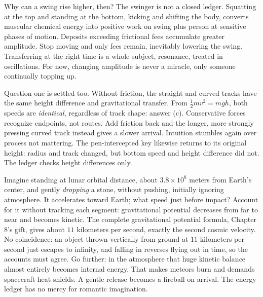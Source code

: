 Why can a swing rise higher, then? The swinger is not a closed ledger. Squatting at the top and standing at the bottom, kicking and shifting the body, converts muscular chemical energy into positive work on swing plus person at sensitive phases of motion. Deposits exceeding frictional fees accumulate greater amplitude. Stop moving and only fees remain, inevitably lowering the swing. Transferring at the right time is a whole subject, resonance, treated in oscillations. For now, changing amplitude is never a miracle, only someone continually topping up.

Question one is settled too. Without friction, the straight and curved tracks have the same height difference and gravitational transfer. From \(\frac{1}{2}mv^2=mgh\), both speeds are \emph{identical}, regardless of track shape: answer (c). Conservative forces recognize endpoints, not routes. Add friction back and the longer, more strongly pressing curved track instead gives a slower arrival. Intuition stumbles again over process not mattering. The pen-intercepted key likewise returns to its original height: radius and track changed, but bottom speed and height difference did not. The ledger checks height differences only.


\begin{thought}
Imagine standing at lunar orbital distance, about \(3.8\times10^{8}\) meters from Earth's center, and gently \emph{dropping} a stone, without pushing, initially ignoring atmosphere. It accelerates toward Earth; what speed just before impact? Account for it without tracking each segment: gravitational potential decreases from far to near and becomes kinetic. The complete gravitational potential formula, Chapter 8's gift, gives about \(11\) kilometers per second, exactly the second cosmic velocity. No coincidence: an object thrown vertically from ground at \(11\) kilometers per second just escapes to infinity, and falling in reverses flying out in time, so the accounts must agree. Go further: in the atmosphere that huge kinetic balance almost entirely becomes internal energy. That makes meteors burn and demands spacecraft heat shields. A gentle release becomes a fireball on arrival. The energy ledger has no mercy for romantic imagination.
\end{thought}

